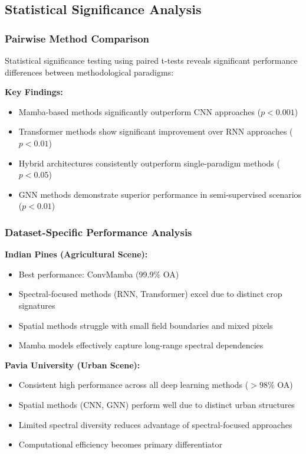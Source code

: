 \documentclass[journal]{IEEEtran}
\begin{document}
\subsection{Statistical Significance Analysis}

\subsubsection{Pairwise Method Comparison}

Statistical significance testing using paired t-tests reveals significant performance differences between methodological paradigms:

\textbf{Key Findings:}
\begin{itemize}
\item Mamba-based methods significantly outperform CNN approaches ($p < 0.001$)
\item Transformer methods show significant improvement over RNN approaches ($p < 0.01$)
\item Hybrid architectures consistently outperform single-paradigm methods ($p < 0.05$)
\item GNN methods demonstrate superior performance in semi-supervised scenarios ($p < 0.01$)
\end{itemize}

\subsubsection{Dataset-Specific Performance Analysis}

\textbf{Indian Pines (Agricultural Scene):}
\begin{itemize}
\item Best performance: ConvMamba (99.9\% OA)
\item Spectral-focused methods (RNN, Transformer) excel due to distinct crop signatures
\item Spatial methods struggle with small field boundaries and mixed pixels
\item Mamba models effectively capture long-range spectral dependencies
\end{itemize}

\textbf{Pavia University (Urban Scene):}
\begin{itemize}
\item Consistent high performance across all deep learning methods ($>98\%$ OA)
\item Spatial methods (CNN, GNN) perform well due to distinct urban structures
\item Limited spectral diversity reduces advantage of spectral-focused approaches
\item Computational efficiency becomes primary differentiator
\end{itemize}
\end{document}
